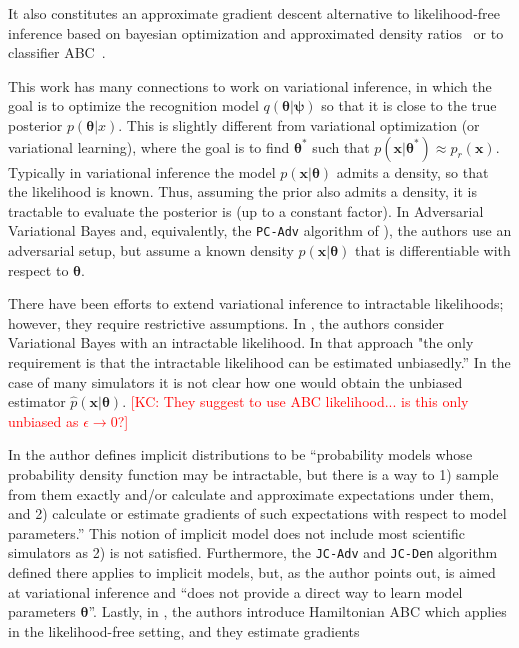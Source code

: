 \documentclass[twocolumn,superscriptaddress,aps]{revtex4-1}
\newcommand{\kcnote}[1]{\textcolor{red}{[KC: #1]}}
\newcommand{\bftheta}{{\bm \theta}}
\newcommand{\bfpsi}{{\bm \psi}}
\newcommand{\bfx}{\mathbf{x}}
\theoremstyle{plain}
\begin{document}
It also constitutes an approximate gradient
descent alternative to likelihood-free inference based on bayesian optimization and approximated density
ratios~\citep{cranmer2015approximating,cranmer2016experiments} or to classifier
ABC~\citep{gutmann2017likelihood}.

This work has many connections to work on variational inference, in which the goal is to optimize the recognition model $q(\bftheta|\bfpsi)$ so that it is close to the true posterior $p(\bftheta|x)$. This is slightly different from variational optimization (or variational learning), where the goal is to find $\bftheta^*$ such that $p(\bfx|\bftheta^*) \approx p_r(\bfx)$.  Typically in variational inference the model $p(\bfx|\bftheta)$ admits a density, so that the likelihood is known. Thus, assuming the prior also admits a density, it is tractable to evaluate the posterior is (up to a constant factor). In Adversarial Variational Bayes \citep{DBLP:journals/corr/MeschederNG17} and, equivalently, the \texttt{PC-Adv} algorithm of  \citep{2017arXiv170208235H}), the authors use an adversarial setup, but assume a known density $p(\bfx|\bftheta)$ that is differentiable with respect to $\bftheta$. 



There have been efforts to extend variational inference to intractable likelihoods; however, they require restrictive assumptions. 
In \citep{tran2017variational}, the authors consider Variational Bayes with an intractable likelihood. In that approach "the only requirement is that the intractable likelihood can be estimated unbiasedly.'' In the case of many simulators it is not clear how one would obtain the unbiased estimator $\hat{p}(\bfx|\bftheta)$.
\kcnote{They suggest to use ABC likelihood... is this only unbiased as $\epsilon \to 0$?}

 In \citep{2017arXiv170208235H} the author defines implicit distributions to be ``probability models whose probability density function may be intractable, but there is a way to 1) sample from them exactly and/or calculate and approximate expectations under them, and 2) calculate or estimate gradients of such expectations with respect to model parameters.'' This notion of implicit model does not include most scientific simulators as 2) is not satisfied. Furthermore, the  \texttt{JC-Adv} and \texttt{JC-Den} algorithm defined there applies to implicit models, but, as the author points out, is aimed at variational inference and ``does not provide a direct way to learn model parameters $\bftheta$''. Lastly, in \citep{meeds2015hamiltonian}, the authors introduce Hamiltonian ABC which applies in the likelihood-free setting, and they estimate gradients 
\end{document}
